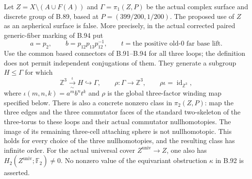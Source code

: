 \label{stmt:B100}
Let $Z=X\setminus(A\cup F(A))$ and $\Gamma=\pi_1(Z,P)$ be the
actual complex surface and discrete group of B.89, based at
$P=(399/200,1/200)$.  The proposed use of $Z$ as an aspherical
surface is false.  More precisely, in the actual corrected paired
generic-fiber marking of B.94 put
\begin{equation}\label{eq:B100-three-loops}
 a=p_2,\qquad b=p_{12}p_{13}p_{12}^{-1},\qquad
 t=\text{the positive old-$0$ far base lift}.
\end{equation}
Use the common based connectors of B.91--B.94 for all three loops;
the definition does not permit independent conjugations of them.
They generate a subgroup $H\leq\Gamma$ for which
\begin{equation}\label{eq:B100-retract}
 \mathbb Z^3\xrightarrow[\sim]{\ \iota\ }H\hookrightarrow\Gamma,
 \qquad \rho:\Gamma\longrightarrow\mathbb Z^3,
 \qquad \rho\iota=\operatorname{id}_{\mathbb Z^3},
\end{equation}
where $\iota(m,n,k)=a^m b^n t^k$ and $\rho$ is the global
three-factor winding map specified below.  There is also a concrete
nonzero class in $\pi_2(Z,P)$: map the three edges and the three
commutator faces of the standard two-skeleton of the three-torus
to these loops and their actual commutator nullhomotopies.  The image
of its remaining three-cell attaching sphere is not nullhomotopic.
This holds for every choice of the three nullhomotopies, and the
resulting class has infinite order.  For the actual universal cover
$Z^{\mathrm{univ}}\to Z$, one also has
$H_2(Z^{\mathrm{univ}};\mathbb F_2)\ne0$.
No nonzero value of the equivariant obstruction $\kappa$ in B.92
is asserted.

